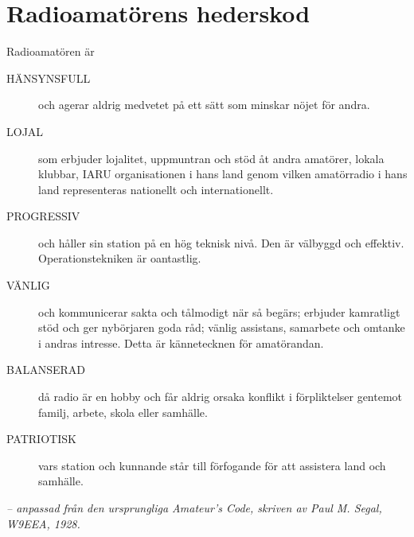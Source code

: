 \newpage %
\section[Hederskod]{Radioamatörens hederskod}

Radioamatören är

\begin{description}
  \item[HÄNSYNSFULL] och agerar aldrig medvetet på ett sätt som minskar nöjet
    för andra.

  \item[LOJAL] som erbjuder lojalitet, uppmuntran och stöd åt andra amatörer,
    lokala klubbar, IARU organisationen i hans land genom vilken amatörradio i
	hans land representeras nationellt och internationellt.

  \item[PROGRESSIV] och håller sin station på en hög teknisk nivå. Den är
    välbyggd och effektiv. Operationstekniken är oantastlig.

  \item[VÄNLIG] och kommunicerar sakta och tålmodigt när så begärs; erbjuder
    kamratligt stöd och ger nybörjaren goda råd; vänlig assistans, samarbete och
    omtanke i andras intresse. Detta är kännetecknen för amatörandan.

  \item[BALANSERAD] då radio är en hobby och får aldrig orsaka konflikt i
    förpliktelser gentemot familj, arbete, skola eller samhälle.

  \item[PATRIOTISK] vars station och kunnande står till förfogande för att
    assistera land och samhälle.
\end{description}

\emph{-- anpassad från den ursprungliga Amateur's Code, skriven av Paul M. Segal, W9EEA, 1928.}
